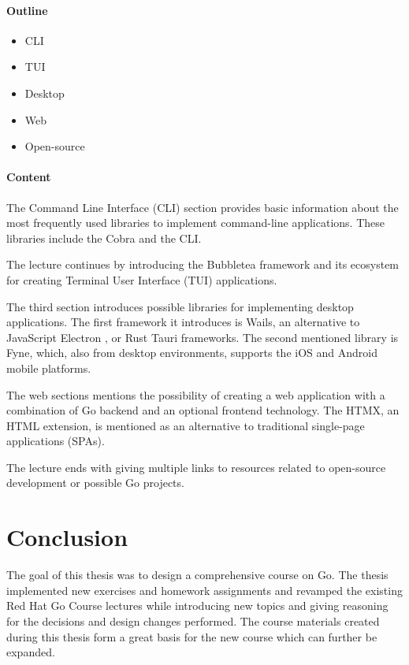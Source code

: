 \documentclass[
  digital,
  color,
  oneside,
  nosansbold,
  nocolorbold,
  nolof,
  nolot,
]{fithesis4}
\begin{document}
\subsubsection{Outline}

\begin{itemize}
    \item CLI
    \item TUI
    \item Desktop
    \item Web
    \item Open-source
\end{itemize}

\subsubsection{Content}

The Command Line Interface (CLI) section provides basic information about the most frequently used libraries to implement command-line applications. These libraries include the Cobra\cite{spf13-cobra} and the CLI\cite{urfave-cli}.

The lecture continues by introducing the Bubbletea\cite{charmbracelet-bubbletea} framework and its ecosystem for creating Terminal User Interface (TUI) applications.

The third section introduces possible libraries for implementing desktop applications. The first framework it introduces is Wails\cite{wailsapp-wails}, an alternative to JavaScript Electron \cite{electron-electron}, or Rust Tauri\cite{tauri-apps-tauri} frameworks. The second mentioned library is Fyne\cite{fyne-io-fyne}, which, also from desktop environments, supports the iOS and Android mobile platforms.

The web sections mentions the possibility of creating a web application with a combination of Go backend and an optional frontend technology. The HTMX\cite{bigskysoftware-htmx}, an HTML extension, is mentioned as an alternative to traditional single-page applications (SPAs).

The lecture ends with giving multiple links to resources related to open-source development or possible Go projects.

\chapter{Conclusion}\label{chapter-conclusion}

The goal of this thesis was to design a comprehensive course on Go. The thesis implemented new exercises and homework assignments and revamped the existing Red Hat Go Course lectures while introducing new topics and giving reasoning for the decisions and design changes performed. The course materials created during this thesis form a great basis for the new course which can further be expanded.
\end{document}
